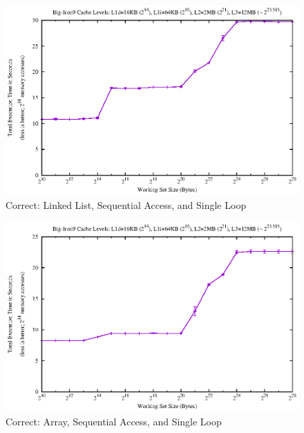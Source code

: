 \begin{figure}[htbp]
\centering
\includegraphics{appendix/plots-cache-measurements/plot-bi9-correct-ll}
\caption{Correct: Linked List, Sequential Access, and Single Loop}
\label{app:correct-ll-seqacc-sl-bi9}
\end{figure}

\begin{figure}[htbp]
\centering
\includegraphics{appendix/plots-cache-measurements/plot-bi9-correct-array}
\caption{Correct: Array, Sequential Access, and Single Loop}
\label{app:correct-arr-seqacc-sl-bi9}
\end{figure}


